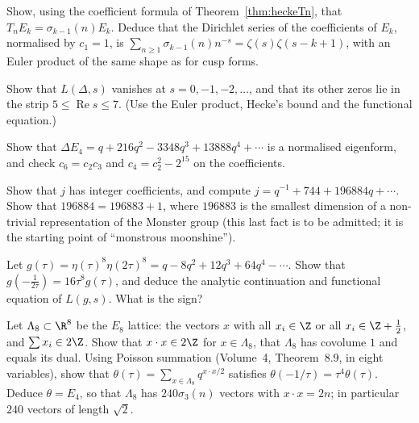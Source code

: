 \begin{exercise}[$\star$]\label{ex:eisenhecke}
Show, using the coefficient formula of Theorem~\ref{thm:heckeTn}, that $T_nE_k=\sigma_{k-1}(n)E_k$. Deduce that the Dirichlet series of the coefficients of
$E_k$, normalised by $c_1=1$, is $\sum_{n\ge1}\sigma_{k-1}(n)n^{-s}=\zeta(s)\zeta(s-k+1)$, with an Euler product of the same shape as for cusp forms.
\end{exercise}

\begin{exercise}[$\star$]\label{ex:trivialzeros}
Show that $L(\Delta,s)$ vanishes at $s=0,-1,-2,\dots$, and that its other zeros lie in the strip $5\le\operatorname{Re}s\le7$. (Use the
Euler product, Hecke's bound and the functional equation.)
\end{exercise}

\begin{exercise}[$\star\star$]\label{ex:deltae4}
Show that $\Delta E_4=q+216q^2-3348q^3+13888q^4+\cdots$ is a normalised eigenform, and check $c_6=c_2c_3$ and $c_4=c_2^2-2^{15}$ on the coefficients.
\end{exercise}

\begin{exercise}[$\star\star$]\label{ex:jint}
Show that $j$ has integer coefficients, and compute $j=q^{-1}+744+196884q+\cdots$. Show that $196884=196883+1$, where $196883$ is the smallest dimension of a non-trivial
representation of the Monster group (this last fact is to be admitted; it is the starting point of ``monstrous moonshine'').
\end{exercise}

\begin{exercise}[$\star\star$]\label{ex:level2}
Let $g(\tau)=\eta(\tau)^8\eta(2\tau)^8=q-8q^2+12q^3+64q^4-\cdots$. Show that $g(-\frac1{2\tau})=16\tau^8g(\tau)$, and deduce the analytic continuation and functional equation
of $L(g,s)$. What is the sign?
\end{exercise}

\begin{exercise}[$\star\star\star$]\label{ex:e8theta}
Let $\Lambda_8\subset\R^8$ be the $E_8$ lattice: the vectors $x$ with all $x_i\in\Z$ or all $x_i\in\Z+\frac12$, and $\sum x_i\in2\Z$. Show that $x\cdot x\in2\Z$ for
$x\in\Lambda_8$, that $\Lambda_8$ has covolume $1$ and equals its dual. Using Poisson summation (Volume~4, Theorem~8.9, in eight variables), show that
$\theta(\tau)=\sum_{x\in\Lambda_8}q^{x\cdot x/2}$ satisfies $\theta(-1/\tau)=\tau^4\theta(\tau)$. Deduce $\theta=E_4$, so that $\Lambda_8$ has $240\sigma_3(n)$ vectors with
$x\cdot x=2n$; in particular $240$ vectors of length $\sqrt2$.
\end{exercise}

